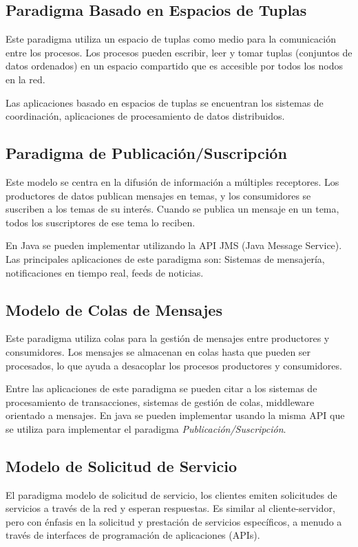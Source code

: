 \subsection{Paradigma Basado en Espacios de Tuplas}
Este paradigma utiliza un espacio de tuplas como medio para la comunicación entre los procesos. Los procesos pueden escribir, leer y tomar tuplas (conjuntos de datos ordenados) en un espacio compartido que es accesible por todos los nodos en la red.

Las aplicaciones basado en espacios de tuplas se encuentran los sistemas de coordinación, aplicaciones de procesamiento de datos distribuidos.

\subsection{Paradigma de Publicación/Suscripción}
Este modelo se centra en la difusión de información a múltiples receptores. Los productores de datos publican mensajes en temas, y los consumidores se suscriben a los temas de su interés. Cuando se publica un mensaje en un tema, todos los suscriptores de ese tema lo reciben.

En Java se pueden implementar utilizando la API JMS (Java Message Service). Las principales aplicaciones de este paradigma son: Sistemas de mensajería, notificaciones en tiempo real, feeds de noticias.

\subsection{Modelo de Colas de Mensajes}

Este paradigma utiliza colas para la gestión de mensajes entre productores y consumidores. Los mensajes se almacenan en colas hasta que pueden ser procesados, lo que ayuda a desacoplar los procesos productores y consumidores.

Entre las aplicaciones de este paradigma se pueden citar a los sistemas de procesamiento de transacciones, sistemas de gestión de colas, middleware orientado a mensajes. En java se pueden implementar usando la misma API que se utiliza para implementar el paradigma \textit{Publicación/Suscripción}.

\subsection{Modelo de Solicitud de Servicio}

El paradigma modelo de solicitud de servicio, los clientes emiten solicitudes de servicios a través de la red y esperan respuestas. Es similar al cliente-servidor, pero con énfasis en la solicitud y prestación de servicios específicos, a menudo a través de interfaces de programación de aplicaciones (APIs).

